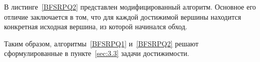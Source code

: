 
В листинге~\ref{BFSRPQ2} представлен модифицированный алгоритм.
Основное его отличие заключается в том, что для каждой достижимой вершины находится конкретная исходная вершина, из которой начинался обход.

Таким образом, алгоритмы~\ref{BFSRPQ1} и~\ref{BFSRPQ2} решают сформулированные в пункте~\ref{sec:3.3} задачи достижимости.
